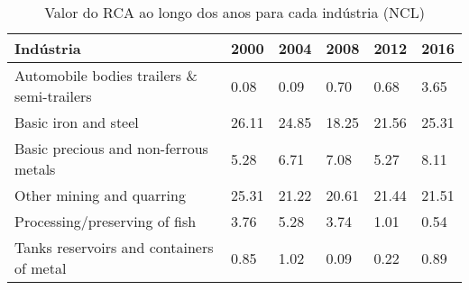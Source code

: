 \begin{table}
\centering
\caption{Valor do RCA ao longo dos anos para cada indústria (NCL)}
\begin{tabular}{p{6cm}p{1.5cm}p{1.5cm}p{1.5cm}p{1.5cm}p{1.5cm}}
\toprule
                                 Indústria &  2000 &  2004 &  2008 &  2012 &  2016 \\
\midrule
Automobile bodies trailers \& semi-trailers &  0.08 &  0.09 &  0.70 &  0.68 &  3.65 \\
                      Basic iron and steel & 26.11 & 24.85 & 18.25 & 21.56 & 25.31 \\
     Basic precious and non-ferrous metals &  5.28 &  6.71 &  7.08 &  5.27 &  8.11 \\
                 Other mining and quarring & 25.31 & 21.22 & 20.61 & 21.44 & 21.51 \\
             Processing/preserving of fish &  3.76 &  5.28 &  3.74 &  1.01 &  0.54 \\
  Tanks reservoirs and containers of metal &  0.85 &  1.02 &  0.09 &  0.22 &  0.89 \\
\bottomrule
\end{tabular}
\end{table}
